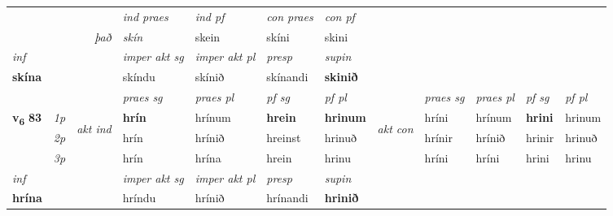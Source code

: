 \begin{longtable}[l]{X>{\footnotesize\itshape}llXXXXlXXXX}
   && &  \textit{ind praes} & \textit{ind pf} & \textit{con praes} & \textit{con pf} \\*
\multicolumn{3}{r}{\textit{það}} & skín & skein & skíni & skini \\*

\cmidrule{4-7}
   {\textit{inf}} & &  & \textit{imper akt sg} & \textit{imper akt pl}   & \textit{presp} & \textit{supin}   \\*
  {\textbf{skína}} & && skíndu  & skínið   & skínandi &  \textbf{skinið}   \\*

\midrule

 & &   & \textit{praes sg}  & \textit{praes pl}    & \textit{ pf sg} & \textit{pf pl} & & \textit{praes sg}  & \textit{praes pl}    & \textit{pf sg} & \textit{pf pl }  \\ \cmidrule{4-7} \cmidrule{9-12}
 \multirow{2}{*}{{{\textbf{v{\textsubscript{6}}} \Large{\textbf{83}}}}}  & 1p & \multirow{3}{*}{\begin{turn}{90}\textit{akt ind}\end{turn}} & \textbf{hrín} & hrínum & \textbf{hrein} & \textbf{hrinum} & \multirow{3}{*}{\begin{turn}{90}\textit{akt con}\end{turn}} &hríni & hrínum & \textbf{hrini} & hrinum\\*
 & 2p &  &  hrín  & hrínið & hreinst & hrinuð & & hrínir & hrínið & hrinir & hrinuð \\*
 & 3p &  & hrín & hrína & hrein & hrinu & & hríni & hríni& hrini & hrinu \\*
\cmidrule{4-7} \cmidrule{9-12}

   {\textit{inf}} & &  & \textit{imper akt sg} & \textit{imper akt pl}   & \textit{presp} & \textit{supin}   \\*
  {\textbf{hrína}} & && hríndu  & hrínið   & hrínandi &  \textbf{hrinið}   \\*

\midrule


\end{longtable}
